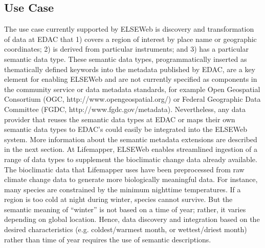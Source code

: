 \documentclass[letterpaper]{article}
\begin{document}
\subsection{Use Case}
The use case currently supported by ELSEWeb is discovery and transformation of data at EDAC that 1) covers a region of interest by place name or geographic coordinates; 2) is derived from particular instruments; and 3) has a particular semantic data type. These semantic data types, programmatically inserted as thematically defined keywords into the metadata published by EDAC, are a key element for enabling ELSEWeb and are not currently specified as components in the community service or data metadata standards, for example Open Geospatial Consortium (OGC, http://www.opengeospatial.org/) or Federal Geographic Data Committee (FGDC, http://www.fgdc.gov/metadata). Nevertheless, any data provider that reuses the semantic data types at EDAC or maps their own semantic data types to EDAC's could easily be integrated into the ELSEWeb system. More information about the semantic metadata extensions are described in the next section. At Lifemapper, ELSEWeb enables streamlined ingestion of a range of data types to supplement the bioclimatic change data already available. The bioclimatic data that Lifemapper uses have been preprocessed from raw climate change data to generate more biologically meaningful data. For instance, many species are constrained by the minimum nighttime temperatures. If a region is too cold at night during winter, species cannot survive. But the semantic meaning of ``winter'' is not based on a time of year; rather, it varies depending on global location. Hence, data discovery and integration based on the desired characteristics (e.g. coldest/warmest month, or wettest/driest month) rather than time of year requires the use of semantic descriptions. 
\end{document}
